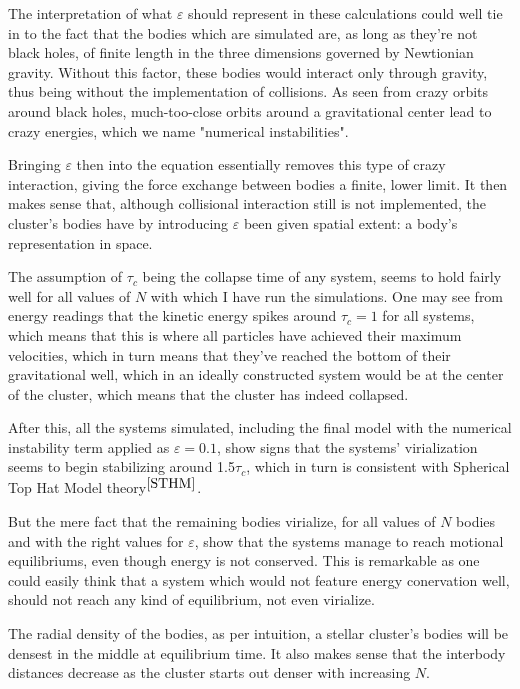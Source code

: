 \documentclass[11pt,a4paper,notitlepage,twocolumn]{article}
\begin{document}
The interpretation of what $\varepsilon$ should represent in these calculations could well tie in to the fact that the bodies which are simulated are, as long as they're not black holes, of finite length in the three dimensions governed by Newtionian gravity. Without this factor, these bodies would interact only through gravity, thus being without the implementation of collisions. As seen from crazy orbits around black holes, much-too-close orbits around a gravitational center lead to crazy energies, which we name "numerical instabilities".

Bringing $\varepsilon$ then into the equation essentially removes this type of crazy interaction, giving the force exchange between bodies a finite, lower limit. It then makes sense that, although collisional interaction still is not implemented, the cluster's bodies have by introducing $\varepsilon$ been given spatial extent: a body's representation in space.

The assumption of $\tau_c$ being the collapse time of any system, seems to hold fairly well for all values of $N$ with which I have run the simulations. One may see from energy readings that the kinetic energy spikes around $\tau_c = 1$ for all systems, which means that this is where all particles have achieved their maximum velocities, which in turn means that they've reached the bottom of their gravitational well, which in an ideally constructed system would be at the center of the cluster, which means that the cluster has indeed collapsed.

After this, all the systems simulated, including the final model with the numerical instability term applied as $\varepsilon = 0.1$, show signs that the systems' virialization seems to begin stabilizing around 1.5$\tau_c$, which in turn is consistent with Spherical Top Hat Model theory$^{\cite{STHM}}$.

But the mere fact that the remaining bodies virialize, for all values of $N$ bodies and with the right values for $\varepsilon$, show that the systems manage to reach motional equilibriums, even though energy is not conserved. This is remarkable as one could easily think that a system which would not feature energy conervation well, should not reach any kind of equilibrium, not even virialize.

The radial density of the bodies, as per intuition, a stellar cluster's bodies will be densest in the middle at equilibrium time. It also makes sense that the interbody distances decrease as the cluster starts out denser with increasing $N$.
\end{document}
